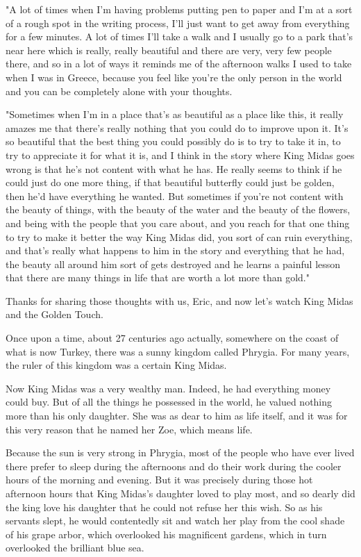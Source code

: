 "A lot of times when I'm having problems putting pen to paper and I'm at a sort of a rough spot in the writing process, I'll just want to get away from everything for a few minutes. A lot of times I'll take a walk and I usually go to a park that's near here which is really, really beautiful and there are very, very few people there, and so in a lot of ways it reminds me of the afternoon walks I used to take when I was in Greece, because you feel like you're the only person in the world and you can be completely alone with your thoughts.

"Sometimes when I'm in a place that's as beautiful as a place like this, it really amazes me that there's really nothing that you could do to improve upon it. It's so beautiful that the best thing you could possibly do is to try to take it in, to try to appreciate it for what it is, and I think in the story where King Midas goes wrong is that he's not content with what he has. He really seems to think if he could just do one more thing, if that beautiful butterfly could just be golden, then he'd have everything he wanted. But sometimes if you're not content with the beauty of things, with the beauty of the water and the beauty of the flowers, and being with the people that you care about, and you reach for that one thing to try to make it better the way King Midas did, you sort of can ruin everything, and that's really what happens to him in the story and everything that he had, the beauty all around him sort of gets destroyed and he learns a painful lesson that there are many things in life that are worth a lot more than gold."

Thanks for sharing those thoughts with us, Eric, and now let's watch King Midas and the Golden Touch.

Once upon a time, about 27 centuries ago actually, somewhere on the coast of what is now Turkey, there was a sunny kingdom called Phrygia. For many years, the ruler of this kingdom was a certain King Midas.

Now King Midas was a very wealthy man. Indeed, he had everything money could buy. But of all the things he possessed in the world, he valued nothing more than his only daughter. She was as dear to him as life itself, and it was for this very reason that he named her Zoe, which means life.

Because the sun is very strong in Phrygia, most of the people who have ever lived there prefer to sleep during the afternoons and do their work during the cooler hours of the morning and evening. But it was precisely during those hot afternoon hours that King Midas's daughter loved to play most, and so dearly did the king love his daughter that he could not refuse her this wish. So as his servants slept, he would contentedly sit and watch her play from the cool shade of his grape arbor, which overlooked his magnificent gardens, which in turn overlooked the brilliant blue sea.

